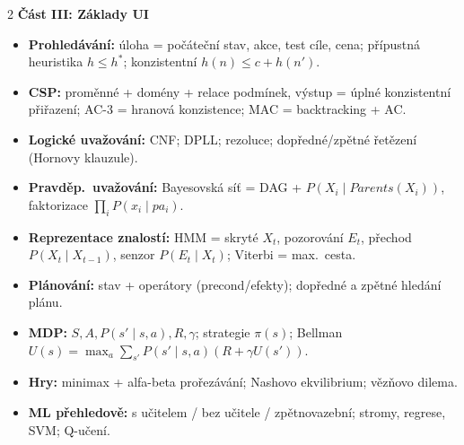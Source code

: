 \begin{multicols}{2}
\columnbreak
\textbf{\color{mffblue}Část III: Základy UI}
\begin{itemize}[leftmargin=1em,itemsep=1.5pt,topsep=2pt]
  \item \textbf{Prohledávání:} úloha = počáteční stav, akce, test cíle, cena; přípustná heuristika $h\le h^*$; konzistentní $h(n)\le c+h(n')$.
  \item \textbf{CSP:} proměnné + domény + relace podmínek, výstup = úplné konzistentní přiřazení; AC-3 = hranová konzistence; MAC = backtracking + AC.
  \item \textbf{Logické uvažování:} CNF; DPLL; rezoluce; dopředné/zpětné řetězení (Hornovy klauzule).
  \item \textbf{Pravděp.\ uvažování:} Bayesovská síť = DAG + $P(X_i\mid Parents(X_i))$, faktorizace $\prod_i P(x_i\mid pa_i)$.
  \item \textbf{Reprezentace znalostí:} HMM = skryté $X_t$, pozorování $E_t$, přechod $P(X_t\mid X_{t-1})$, senzor $P(E_t\mid X_t)$; Viterbi = max.\ cesta.
  \item \textbf{Plánování:} stav + operátory (precond/efekty); dopředné a zpětné hledání plánu.
  \item \textbf{MDP:} $S,A,P(s'\mid s,a),R,\gamma$; strategie $\pi(s)$; Bellman $U(s)=\max_a\sum_{s'}P(s'\mid s,a)(R+\gamma U(s'))$.
  \item \textbf{Hry:} minimax + alfa-beta prořezávání; Nashovo ekvilibrium; vězňovo dilema.
  \item \textbf{ML přehledově:} s učitelem / bez učitele / zpětnovazební; stromy, regrese, SVM; Q-učení.
\end{itemize}


\end{multicols}
